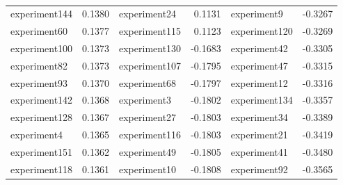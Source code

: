 \begin{table}[ht]
{\begin{tabular}{lr@{\hspace{1cm}}lr@{\hspace{1cm}}lr}
            experiment144                         & 0.1380                    & experiment24                     & 0.1131                     & experiment9                     & -0.3267                    \\
            experiment60                          & 0.1377                    & \cellcolor{gray!25}experiment115 & \cellcolor{gray!25}0.1123  & experiment120                   & -0.3269                    \\
            experiment100                         & 0.1373                    & \cellcolor{gray!25}experiment130 & \cellcolor{gray!25}-0.1683 & experiment42                    & -0.3305                    \\
            experiment82                          & 0.1373                    & experiment107                    & -0.1795                    & experiment47                    & -0.3315                    \\
            experiment93                          & 0.1370                    & experiment68                     & -0.1797                    & experiment12                    & -0.3316                    \\
            experiment142                         & 0.1368                    & experiment3                      & -0.1802                    & experiment134                   & -0.3357                    \\
            experiment128                         & 0.1367                    & experiment27                     & -0.1803                    & experiment34                    & -0.3389                    \\
            experiment4                           & 0.1365                    & experiment116                    & -0.1803                    & experiment21                    & -0.3419                    \\
            experiment151                         & 0.1362                    & experiment49                     & -0.1805                    & experiment41                    & -0.3480                    \\
            experiment118                         & 0.1361                    & experiment10                     & -0.1808                    & experiment92                    & -0.3565                    \\
            \bottomrule
        \end{tabular}
    }
    \caption{}
    \label{tab:fullBradleyTerry}
\end{table}
